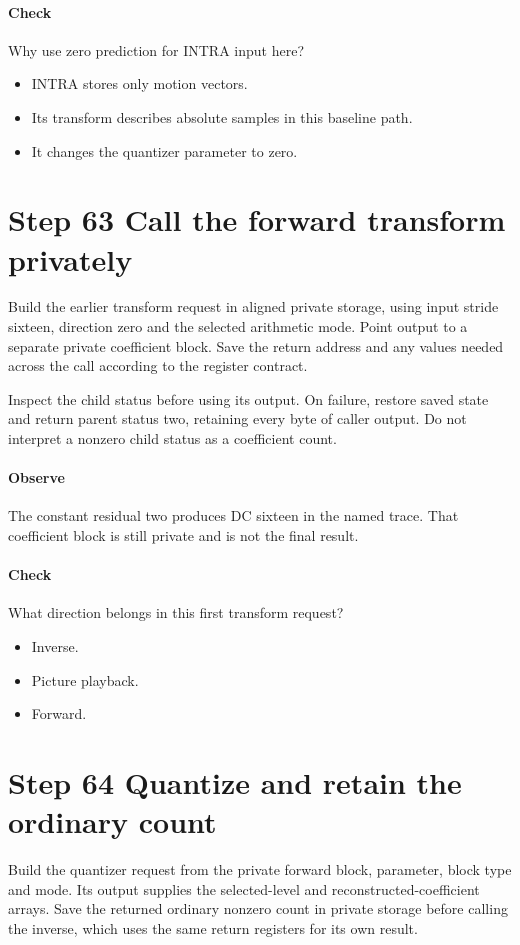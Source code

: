 \paragraph{Check} Why use zero prediction for INTRA input here?
\begin{itemize}
  \item[A.] INTRA stores only motion vectors.
  \item[B.] Its transform describes absolute samples in this baseline path.
  \item[C.] It changes the quantizer parameter to zero.
\end{itemize}

\section{Step 63 Call the forward transform privately}\label{h263-block-s03}
Build the earlier transform request in aligned private storage, using input
stride sixteen, direction zero and the selected arithmetic mode. Point output
to a separate private coefficient block. Save the return address and any values
needed across the call according to the register contract.

Inspect the child status before using its output. On failure, restore saved
state and return parent status two, retaining every byte of caller output.
Do not interpret a nonzero child status as a coefficient count.

\paragraph{Observe} The constant residual two produces DC sixteen in the named
trace. That coefficient block is still private and is not the final result.
\paragraph{Check} What direction belongs in this first transform request?
\begin{itemize}
  \item[A.] Inverse.
  \item[B.] Picture playback.
  \item[C.] Forward.
\end{itemize}

\section{Step 64 Quantize and retain the ordinary count}\label{h263-block-s04}
Build the quantizer request from the private forward block, parameter, block type
and mode. Its output supplies the selected-level and reconstructed-coefficient
arrays. Save the returned ordinary nonzero count in private storage before
calling the inverse, which uses the same return registers for its own result.

